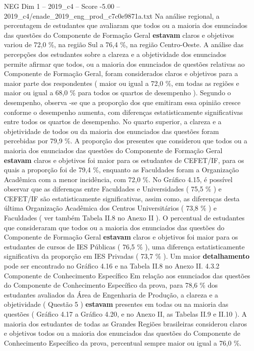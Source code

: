 \begin{textsample}{NEG Dim 1 – 2019\_c4 – Score -5.00 – 2019\_c4/enade\_2019\_eng\_prod\_c7c0e9871a.txt}
Na análise regional, a percentagem de estudantes que avaliaram que todos ou a maioria dos enunciados das questões do Componente de Formação Geral \textbf{estavam} claros e objetivos variou de 72,0 \%, na região Sul a 76,4 \%, na região Centro-Oeste.
A análise das percepções dos estudantes sobre a clareza e a objetividade dos enunciados permite afirmar que todos, ou a maioria dos enunciados de questões relativas ao Componente de Formação Geral, foram considerados claros e objetivos para a maior parte dos respondentes ( maior ou igual a 72,0 \%, em todas as regiões e maior ou igual a 68,0 \% para todos os quartos de desempenho ).
Segundo o desempenho, observa -se que a proporção dos que emitiram essa opinião cresce conforme o desempenho aumenta, com diferenças estatisticamente significativas entre todos os quartos de desempenho.
No quarto superior, a clareza e a objetividade de todos ou da maioria dos enunciados das questões foram percebidas por 79,9 \%.
A proporção dos presentes que considerou que todos ou a maioria dos enunciados das questões do Componente de Formação Geral \textbf{estavam} claros e objetivos foi maior para os estudantes de CEFET/IF, para os quais a proporção foi de 79,4 \%, enquanto as Faculdades foram a Organização Acadêmica com a menor incidência, com 72,0 \%.
No Gráfico 4.15, é possível observar que as diferenças entre Faculdades e Universidades ( 75,5 \% ) e CEFET/IF são estatisticamente significativas, assim como, as diferenças desta última Organização Acadêmica dos Centros Universitários ( 73,8 \% ) e Faculdades ( ver também Tabela II.8 no Anexo II ).
O percentual de estudantes que consideraram que todos ou a maioria dos enunciados das questões do Componente de Formação Geral \textbf{estavam} claros e objetivos foi maior para os estudantes de cursos de IES Públicas ( 76,5 \% ), uma diferença estatisticamente significativa da proporção em IES Privadas ( 73,7 \% ).
Um maior \textbf{detalhamento} pode ser encontrado no Gráfico 4.16 e na Tabela II.8 no Anexo II. 4.3.2 Componente de Conhecimento Específico Em relação aos enunciados das questões do Componente de Conhecimento Específico da prova, para 78,6 \% dos estudantes avaliados da Área de Engenharia de Produção, a clareza e a objetividade ( Questão 5 ) \textbf{estavam} presentes em todas ou na maioria das questões ( Gráfico 4.17 a Gráfico 4.20, e no Anexo II, as Tabelas II.9 e II.10 ).
A maioria dos estudantes de todas as Grandes Regiões brasileiras considerou claros e objetivos todos ou a maioria dos enunciados das questões do Componente de Conhecimento Específico da prova, percentual sempre maior ou igual a 76,0 \%.

\end{textsample}

